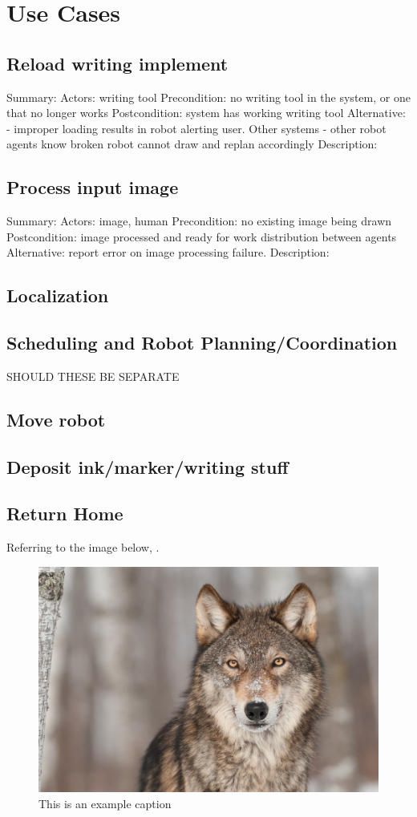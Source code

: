 
\section{Use Cases}
\label{sec:use_cases}

\subsection{Reload writing implement}
Summary: 
Actors:  writing tool
Precondition: no writing tool in the system, or one that no longer works
Postcondition: system has working writing tool
Alternative: - improper loading results in robot alerting user. Other systems
             - other robot agents know broken robot cannot draw and replan accordingly
Description:

\subsection{Process input image}
Summary:
Actors: image, human
Precondition:  no existing image being drawn
Postcondition: image processed and ready for work distribution between agents
Alternative: report error on image processing failure.
Description:

\subsection{Localization}

\subsection{Scheduling and Robot Planning/Coordination}
SHOULD THESE BE SEPARATE

\subsection{Move robot}

\subsection{Deposit ink/marker/writing stuff}

\subsection{Return Home}
Referring to the image below, . 


\begin{figure}
 \centering
 \includegraphics[width=0.5\columnwidth]{figs/example_picture.jpg}
 \caption{This is an example caption}
 \label{fig:example_figure}
\end{figure}


